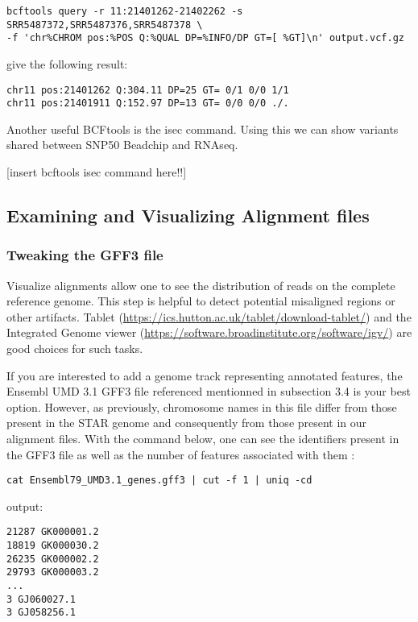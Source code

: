 \begin{verbatim}
bcftools query -r 11:21401262-21402262 -s SRR5487372,SRR5487376,SRR5487378 \
-f 'chr%CHROM pos:%POS Q:%QUAL DP=%INFO/DP GT=[ %GT]\n' output.vcf.gz
\end{verbatim}


give the following result:
\begin{verbatim}
chr11 pos:21401262 Q:304.11 DP=25 GT= 0/1 0/0 1/1
chr11 pos:21401911 Q:152.97 DP=13 GT= 0/0 0/0 ./.
\end{verbatim}


Another useful BCFtools is the isec command. Using this we can show variants shared between SNP50 Beadchip and RNAseq.

[insert bcftools isec command here!!]



\subsection{Examining and Visualizing Alignment files}


\subsubsection{Tweaking the GFF3 file}

Visualize alignments allow one to see the distribution of reads on the complete reference genome. This step is helpful to detect potential misaligned regions or other artifacts. Tablet (\href{https://ics.hutton.ac.uk/tablet/download-tablet/}{https://ics.hutton.ac.uk/tablet/download-tablet/}) and the Integrated Genome viewer (\href{https://software.broadinstitute.org/software/igv/}{https://software.broadinstitute.org/software/igv/}) are good choices for such tasks.


If you are interested to add a genome track representing annotated features, the Ensembl UMD 3.1 GFF3 file referenced mentionned in subsection 3.4 is your best option. However, as previously, chromosome names in this file differ from those present in the STAR genome and consequently from those present in our alignment files. With the command below, one can see the identifiers present in the GFF3 file as well as the number of features associated with them :

\begin{verbatim}
cat Ensembl79_UMD3.1_genes.gff3 | cut -f 1 | uniq -cd
\end{verbatim}


\noindent output:
\begin{verbatim}
21287 GK000001.2
18819 GK000030.2
26235 GK000002.2
29793 GK000003.2
...
3 GJ060027.1
3 GJ058256.1
\end{verbatim}

